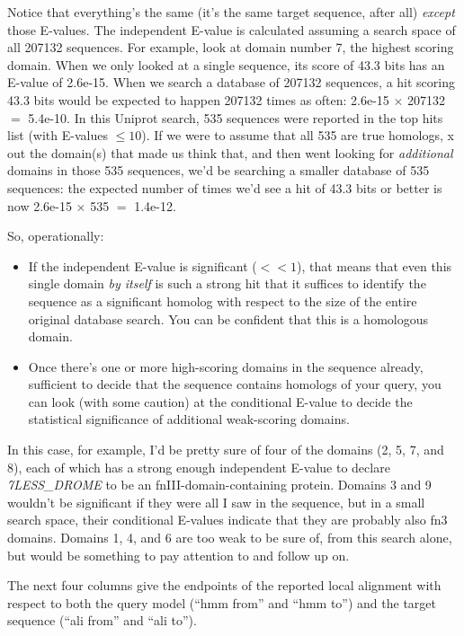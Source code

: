 Notice that everything's the same (it's the same target sequence,
after all) \emph{except} those E-values. The independent E-value is
calculated assuming a search space of all 207132 sequences. For
example, look at domain number 7, the highest scoring domain. When we
only looked at a single sequence, its score of 43.3 bits has an
E-value of 2.6e-15. When we search a database of 207132 sequences, a
hit scoring 43.3 bits would be expected to happen 207132 times as
often: 2.6e-15 $\times$ 207132 $=$ 5.4e-10. In this Uniprot search,
535 sequences were reported in the top hits list (with E-values $\leq
10$). If we were to assume that all 535 are true homologs, x out the
domain(s) that made us think that, and then went looking for
\emph{additional} domains in those 535 sequences, we'd be searching a
smaller database of 535 sequences: the expected number of times we'd
see a hit of 43.3 bits or better is now 2.6e-15 $\times$ 535 $=$
1.4e-12.

So, operationally:

\begin{itemize}
\item If the independent E-value is significant ($<<1$), that means
that even this single domain \emph{by itself} is such a strong hit
that it suffices to identify the sequence as a significant homolog
with respect to the size of the entire original database search. You
can be confident that this is a homologous domain.

\item Once there's one or more high-scoring domains in the sequence
already, sufficient to decide that the sequence contains homologs of
your query, you can look (with some caution) at the conditional
E-value to decide the statistical significance of additional
weak-scoring domains.
\end{itemize}

In this case, for example, I'd be pretty sure of four of the domains
(2, 5, 7, and 8), each of which has a strong enough independent
E-value to declare \emph{7LESS\_DROME} to be an
fnIII-domain-containing protein. Domains 3 and 9 wouldn't be
significant if they were all I saw in the sequence, but in a small
search space, their conditional E-values indicate that they are
probably also fn3 domains. Domains 1, 4, and 6 are too weak to be sure
of, from this search alone, but would be something to pay attention to
and follow up on.

The next four columns give the endpoints of the reported local
alignment with respect to both the query model (``hmm from'' and ``hmm
to'') and the target sequence (``ali from'' and ``ali to''). 


